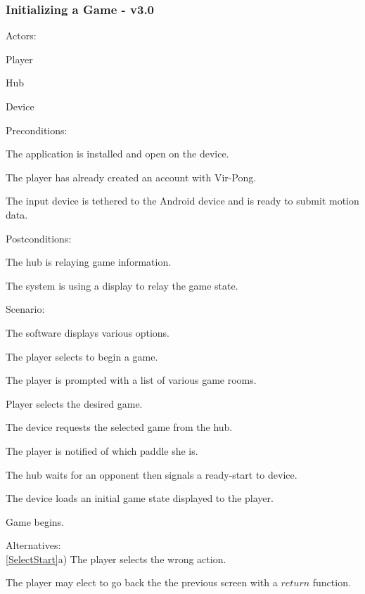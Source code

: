 \documentclass[12pt]{article}
\newenvironment{itemize*}%
  {\begin{itemize}%
  	\setlength{\parsep}{0pt}
    \setlength{\itemsep}{0pt}%
    \setlength{\parskip}{0pt}}%
  {\end{itemize}}
\newenvironment{enumerate*}%
  {\begin{enumerate}%
  	\setlength{\parsep}{0pt}
    \setlength{\itemsep}{0pt}%
    \setlength{\parskip}{0pt}}%
  {\end{enumerate}}
\begin{document}
\subsubsection*{Initializing a Game - v3.0}
Actors:
\begin{itemize*}
\item Player
\item Hub
\item Device
\end{itemize*}
Preconditions:
\begin{itemize*}
\item The application is installed and open on the device.
\item The player has already created an account with Vir-Pong.
\item The input device is tethered to the Android device and is ready to 
  submit motion data.
\end{itemize*}
Postconditions:
\begin{itemize*}
\item The hub is relaying game information.
\item The system is using a display to relay the game state.
\end{itemize*}
Scenario:
\begin{enumerate*}
\item \label{InitGame_DisplayOptions} The software displays various options.
\item \label{SelectStart}The player selects to begin a game.
\item \label{DisplayGameRooms} The player is prompted with a list of various
game rooms.
\item \label{SelectRoom} Player selects the desired game.
\item \label{SystemRequestsGame}The device requests the selected game from 
the hub.
\item \label{NotifyPaddle} The player is notified of which paddle she is.
\item \label{HubSelectsOpponent}The hub waits for an opponent then signals a 
  ready-start to device.
\item \label{LoadGameState}The device loads an initial game state displayed 
  to the player.
\item Game begins.
\end{enumerate*}
Alternatives:\\
\ref{SelectStart}a) The player selects the wrong action.
\begin{enumerate*}
\item The player may elect to go back the the previous screen with a 
  $return$ function.
\end{enumerate*}
\end{document}
